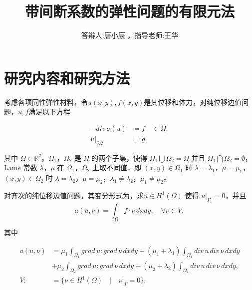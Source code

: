 \documentclass[UTF8]{ctexbeamer} %
\title{带间断系数的弹性问题的有限元法}
\author[唐小康]{答辩人:唐小康 ，指导老师:王华}
\begin{document}
\begin{frame}
	\titlepage
\end{frame}

\begin{frame}
	\tableofcontents
\end{frame}

\section{研究内容和研究方法}

\begin{frame}
	
	考虑各项同性弹性材料，令$u(x,y),f(x,y)$是其位移和体力，对纯位移边值问题，$u,f$满足以下方程
	
	\begin{equation}
		\begin{aligned}
			-div \, \sigma(u) &= f \quad  \in \Omega , \\
			u|_{\partial \Omega} &= g .
		\end{aligned}
		\label{elasiticityEq} 
	\end{equation}

其中 $\Omega \in \mathbb{R}^2$。$\Omega_1$，$\Omega_2$ 是 $\Omega$ 的两个子集，使得 $\Omega_1 \bigcup \Omega_2 = \Omega$ 并且 $\Omega_1 \bigcap \Omega_2 = \emptyset$，Lam$\acute{e}$ 常数 $\lambda$，$\mu$ 在 $\Omega_1$，$\Omega_2$ 上取不同值，即 $(x,y) \in \Omega_1$ 时 $\lambda = \lambda_1$，$\mu = \mu_1$，$(x,y) \in \Omega_2$ 时 $\lambda = \lambda_2$，$\mu = \mu_2$，$\lambda_1 \ne \lambda_2$，$\mu_1 \ne \mu_2$。
\end{frame}

\begin{frame}
	对齐次的纯位移边值问题，其变分形式为，求$u \in H^1(\Omega)$ 使得 $u |_{\Gamma_1} = 0$，并且
	\begin{equation}
		a(u,\nu) = \int_{\Omega} f \cdot \nu \, dxdy, \quad \forall \nu \in V ,
		\label{bffc}
	\end{equation}
	\par
	其中
	
	\begin{equation}
		\begin{aligned}
			a(u,\nu) &= \mu_1 \int_{\Omega_1} grad \, u : grad \, \nu \, dxdy + (\mu_1 +\lambda_1) \int_{\Omega_1} div \, u \, div \, \nu \,  dxdy \\
			&+ \mu_2 \int_{\Omega_2} grad \, u : grad \, \nu \, dxdy + (\mu_2 +\lambda_2) \int_{\Omega_2} div \, u \, div \, \nu \, dxdy , \\  		
			V :&= \{ \nu \in H^1(\Omega) \quad | \quad \nu |_{\Gamma} = 0 \} .
		\end{aligned}
	\end{equation}
\end{frame}
\end{document}
